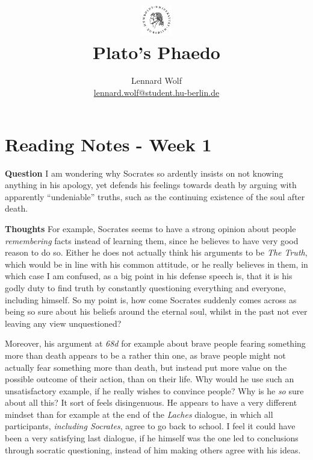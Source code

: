\documentclass[a4paper]{article}
\date{\vspace{-3ex}}
\begin{document}
\title{
    \vspace{-30pt}
	\includegraphics*[width=0.1\textwidth,left]{ErstesSem/images/hu_logo2.png}\\
	\vspace{-10pt}
	Plato's Phaedo}
\author{Lennard Wolf\\
        \small{\href{mailto:lennard.wolf@student.hu-berlin.de}{lennard.wolf@student.hu-berlin.de}}}
\maketitle
\vspace{-4pt}

\section*{Reading Notes - Week 1}
\large

\textbf{Question} I am wondering why Socrates so ardently insists on not knowing anything in his apology, yet defends his feelings towards death by arguing with apparently "`undeniable"' truths, such as the continuing existence of the soul after death.\newline

\noindent \textbf{Thoughts} For example, Socrates seems to have a strong opinion about people \emph{remembering} facts instead of learning them, since he believes to have very good reason to do so. Either he does not actually think his arguments to be \emph{The Truth}, which would be in line with his common attitude, or he really believes in them, in which case I am confused, as a big point in his defense speech is, that it is his godly duty to find truth by constantly questioning everything and everyone, including himself. So my point is, how come Socrates suddenly comes across as being so sure about his beliefs around the eternal soul, whilst in the past not ever leaving any view unquestioned? 

Moreover, his argument at \emph{68d} for example about brave people fearing something more than death appears to be a rather thin one, as brave people might not actually fear something more than death, but instead put more value on the possible outcome of their action, than on their life. Why would he use such an unsatisfactory example, if he really wishes to convince people? Why is he \emph{so} sure about all this? It sort of feels disingenuous. He appears to have a very different mindset than for example at the end of the \emph{Laches} dialogue, in which all participants, \emph{including Socrates}, agree to go back to school. I feel it could have been a very satisfying last dialogue, if he himself was the one led to conclusions through socratic questioning, instead of him making others agree with his ideas.  
\end{document}
